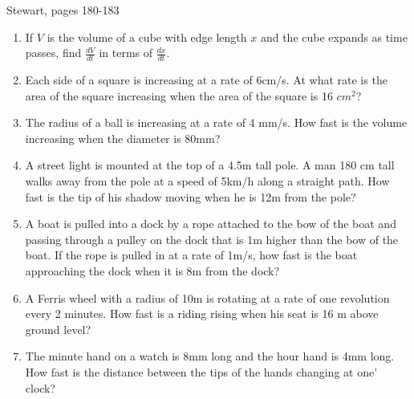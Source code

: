 Stewart, pages 180-183
\begin{enumerate}
\item If $V$ is the volume of a cube with edge length $x$ and the cube expands as time passes, find $\frac{dV}{dt}$ in terms of $\frac{dx}{dt}$.
\item Each side of a square is increasing at a rate of 6cm/s. At what rate is the area of the square increasing when the area of the square is 16 $cm^2$?
\item The radius of a ball is increasing at a rate of 4 mm/s. How fast is the volume increasing when the diameter is 80mm?
\item 
A street light is mounted at the top of a 4.5m tall pole. A man 180 cm tall walks away from the pole at a speed of 5km/h along a straight path. How fast is the tip of his shadow moving when he is 12m from the pole?


\item 
A boat is pulled into a dock by a rope attached to the bow of the boat and passing through a pulley on the dock that is 1m higher than the bow of the boat. If the rope is pulled in at a rate of 1m/s, how fast is the boat approaching the dock when it is 8m from the dock?

\item 
A Ferris wheel with a radius of 10m is rotating at a rate of one revolution every 2 minutes. How fast is a riding rising when his seat is 16 m above ground level?

\item 
The minute hand on a watch is 8mm long and the hour hand is 4mm long. How fast is the distance between the tips of the hands changing at one' clock?
\end{enumerate}



